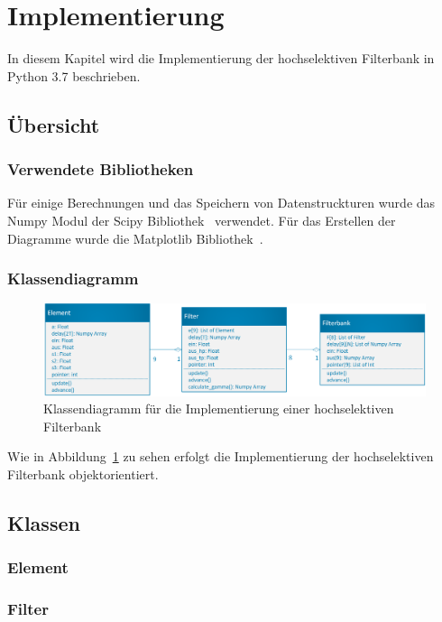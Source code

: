 \section{Implementierung}
In diesem Kapitel wird die Implementierung der hochselektiven Filterbank in Python 3.7 beschrieben.

\subsection{Übersicht}\label{sec:impl_ueber}

\subsubsection{Verwendete Bibliotheken}\label{sec:impl_bib}
Für einige Berechnungen und das Speichern von Datenstruckturen wurde das Numpy Modul der Scipy Bibliothek~\cite{scipy} verwendet. Für das Erstellen der Diagramme wurde die Matplotlib Bibliothek~\cite{Hunter:2007}.
\subsubsection{Klassendiagramm}\label{sec:impl_klass}
\begin{figure}
  \centering
  \includegraphics[width=1\textwidth]{img/klassendia}
  \caption{Klassendiagramm für die Implementierung einer hochselektiven Filterbank}\label{fig:impl_klassdia}
\end{figure}
Wie in Abbildung~\ref{fig:impl_klassdia} zu sehen erfolgt die Implementierung der hochselektiven Filterbank objektorientiert. 
\subsection{Klassen}\label{sec:impl_klassen}

\subsubsection{Element}\label{sec:impl_ele}

\subsubsection{Filter}\label{sec:impl_Filter}

